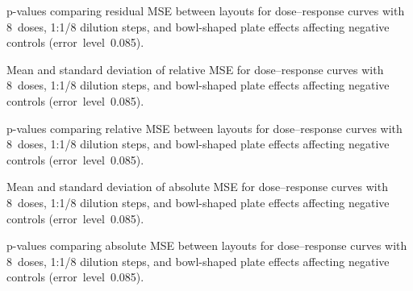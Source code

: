 \begin{table}[p]
    \centering
    \small
    
    \caption{p-values comparing residual MSE between layouts for dose--response curves with 8~doses, 1:1/8 dilution steps, and bowl-shaped plate effects affecting negative controls (error~level~0.085).}
    \label{tab:dr-residuals-pvalues-8doses-dil8-bowl-neg-controls-0.085}
\end{table}

\clearpage
\begin{table}[p]
    \centering
    \small
    
    \caption{Mean and standard deviation of relative \ECIC{} MSE for dose--response curves with 8~doses, 1:1/8 dilution steps, and bowl-shaped plate effects affecting negative controls (error~level~0.085).}
    \label{tab:dr-relic50-mean-std-8doses-dil8-bowl-neg-controls-0.085}
\end{table}

\begin{table}[p]
    \centering
    \small
    
    \caption{p-values comparing relative \ECIC{} MSE between layouts for dose--response curves with 8~doses, 1:1/8 dilution steps, and bowl-shaped plate effects affecting negative controls (error~level~0.085).}
    \label{tab:dr-relic50-pvalues-8doses-dil8-bowl-neg-controls-0.085}
\end{table}

\begin{table}[p]
    \centering
    \small
    
    \caption{Mean and standard deviation of absolute \ECIC{} MSE for dose--response curves with 8~doses, 1:1/8 dilution steps, and bowl-shaped plate effects affecting negative controls (error~level~0.085).}
    \label{tab:dr-absic50-mean-std-8doses-dil8-bowl-neg-controls-0.085}
\end{table}

\begin{table}[p]
    \centering
    \small
    
    \caption{p-values comparing absolute \ECIC{} MSE between layouts for dose--response curves with 8~doses, 1:1/8 dilution steps, and bowl-shaped plate effects affecting negative controls (error~level~0.085).}
    \label{tab:dr-absic50-pvalues-8doses-dil8-bowl-neg-controls-0.085}
\end{table}

